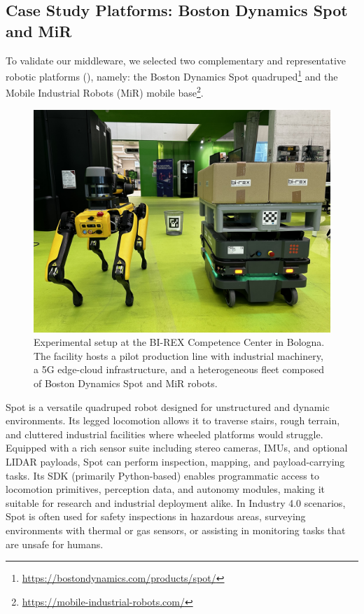 \documentclass[conference]{IEEEtran}
\begin{document}
\subsection{Case Study Platforms: Boston Dynamics Spot and MiR}

To validate our middleware, 
 we selected two complementary and representative robotic platforms (), namely: 
 the Boston Dynamics Spot quadruped\footnote{\url{https://bostondynamics.com/products/spot/}}
 and the Mobile Industrial Robots (MiR) mobile base\footnote{\url{https://mobile-industrial-robots.com/}}.

\begin{figure}[htb]
    \centering
    \includegraphics[width=1\columnwidth]{images/robots.jpeg}
    \caption{
        Experimental setup at the BI-REX Competence Center in Bologna. 
        The facility hosts a pilot production line with industrial machinery, 
        a 5G edge-cloud infrastructure, and a heterogeneous fleet composed of Boston Dynamics Spot and MiR robots.
    }
    \label{fig:robots}
\end{figure}

Spot is a versatile quadruped robot designed for unstructured and dynamic environments. 
%
Its legged locomotion allows it to traverse stairs, rough terrain, 
 and cluttered industrial facilities where wheeled platforms would struggle. 
% 
Equipped with a rich sensor suite including stereo cameras, IMUs, and optional LIDAR payloads, 
 Spot can perform inspection, mapping, and payload-carrying tasks. 
% 
Its SDK (primarily Python-based) enables programmatic access to locomotion primitives, perception data, 
 and autonomy modules, making it suitable for research and industrial deployment alike. 
% 
In Industry 4.0 scenarios, Spot is often used for safety inspections in hazardous areas, 
 surveying environments with thermal or gas sensors, 
 or assisting in monitoring tasks that are unsafe for humans.
\end{document}
